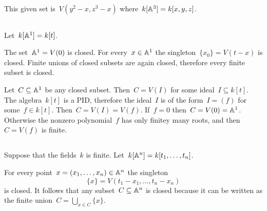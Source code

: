 \section{}





\subsection{}

This given set is~$V(y^2 - x, z^3 - x)$ where~$k[\mathbb{A}^3] = k[x,y,z]$.





\subsection{}

Let~$k[\mathbb{A}^1] = k[t]$.

The set~$\mathbb{A}^1 = V(0)$ is closed.
For every~$x \in \mathbb{A}^1$ the singleton~$\{x_0\} = V(t - x)$ is closed.
Finite unions of closed subsets are again closed, therefore every finite subset is closed.

Let~$C \subseteq \mathbb{A}^1$ be any closed subset.
Then~$C = V(I)$ for some ideal~$I \subseteq k[t]$.
The algebra~$k[t]$ is a PID, therefore the ideal~$I$ is of the form~$I = (f)$ for some~$f \in k[t]$.
Then~$C = V(I) = V(f)$.
If~$f = 0$ then~$C = V(0) = \mathbb{A}^1$.
Otherwise the nonzero polynomial~$f$ has only finitey many roots, and then~$C = V(f)$ is finite.





\subsection{}

Suppose that the fields~$k$ is finite.
Let~$k[\mathbb{A}^n] = k[t_1, \dotsc, t_n]$.

For every point~$x = (x_1, \dotsc, x_n) \in \mathbb{A}^n$ the singleton
\[
  \{x\}
  =
  V(t_1 - x_1, \dotsc, t_n - x_n)
\]
is closed.
It follows that any subset~$C \subseteq \mathbb{A}^n$ is closed because it can be written as the finite union~$C = \bigcup_{x \in C} \{x\}$.




